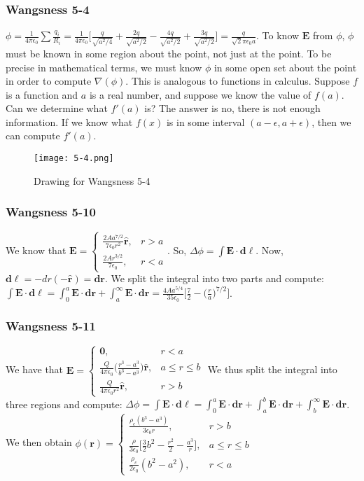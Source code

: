 \documentclass[crop=false,class=article,oneside]{standalone}
\begin{document}
    \subsubsection{Wangsness 5-4}
    $\phi = \frac{1}{4\pi \epsilon_0} \sum \frac{q_i}{R_i} = \frac{1}{4\pi \epsilon_0}\bigg[ \frac{q}{\sqrt{a^2/4}}+\frac{2q}{\sqrt{a^2/2}}-\frac{4q}{\sqrt{a^2/2}}+\frac{3q}{\sqrt{a^2/2}}\bigg] = \frac{q}{\sqrt{2}\pi \epsilon_0 a}$. To know $\mathbf{E}$ from $\phi$, $\phi$ must be known in some region about the point, not just at the point. To be precise in mathematical terms, we must know $\phi$ in some open set about the point in order to compute $\nabla(\phi)$. This is analogous to functions in calculus. Suppose $f$ is a function and $a$ is a real number, and suppose we know the value of $f(a)$. Can we determine what $f'(a)$ is? The answer is no, there is not enough information. If we know what $f(x)$ is in some interval $(a-\epsilon,a+\epsilon)$, then we can compute $f'(a)$.
    \begin{figure}[htbp]
        \centering
        {\texttt{[image: 5-4.png]}}
        \caption{Drawing for Wangsness 5-4}
    \end{figure}
    \subsubsection{Wangsness 5-10}
    We know that $\mathbf{E} = \begin{cases} \frac{2A a^{7/2}}{7\epsilon_0 r^2}\hat{\mathbf{r}}, & r>a \\ \frac{2A r^{3/2}}{7\epsilon_0}, & r<a\end{cases}$. So, $\Delta \phi = \int \mathbf{E} \cdot \mathbf{d\ell}$. Now, $\mathbf{d\ell} = -dr(-\hat{\mathbf{r}}) = \mathbf{dr}$. We split the integral into two parts and compute: $\int \mathbf{E}\cdot \mathbf{d\ell} = \int_{0}^{a} \mathbf{E}\cdot \mathbf{dr} + \int_{a}^{\infty} \mathbf{E}\cdot \mathbf{dr} = \frac{4A a^{5/4}}{35 \epsilon_0}\bigg[ \frac{7}{2}-\big(\frac{r}{a}\big)^{7/2}\bigg]$.
    \subsubsection{Wangsness 5-11}
    We have that $\mathbf{E} = \begin{cases} \mathbf{0}, & r<a\\ \frac{Q}{4\pi \epsilon_0}\bigg(\frac{r^3-a^3}{b^3-a^3}\bigg)\hat{\mathbf{r}}, & a\leq r \leq b\\ \frac{Q}{4\pi \epsilon_0 r^2}\hat{\mathbf{r}}, & r>b\end{cases}$ We thus split the integral into three regions and compute: $\Delta\phi=\int \mathbf{E}\cdot \mathbf{d\ell} = \int_{0}^{a} \mathbf{E}\cdot \mathbf{dr}+\int_{a}^{b} \mathbf{E}\cdot \mathbf{dr}+\int_{b}^{\infty} \mathbf{E}\cdot \mathbf{dr}$. We then obtain $\phi(\mathbf{r}) = \begin{cases} \frac{\rho_c(b^3-a^3)}{3\epsilon_0 r}, & r>b \\ \frac{\rho}{3\epsilon_0}\bigg[ \frac{3}{2}b^2-\frac{r^2}{2}-\frac{a^3}{r}\bigg], & a\leq r \leq b\\ \frac{\rho_c}{2\epsilon_0}(b^2-a^2), & r<a\end{cases}$
\end{document}
